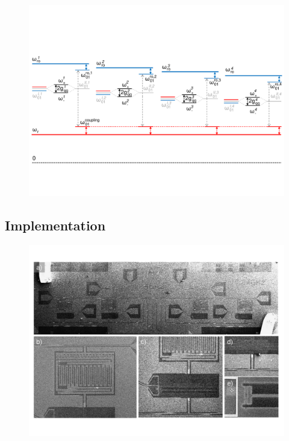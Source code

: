 \begin{figure}[ht!]
	\centering
	\includegraphics[width=\textwidth]{./material/figures/scalable-architecture/qubit_architecture_energy_levels}
	\caption[]{}
	\label{fig:scalable_architecture_energy_levels}
\end{figure}

\subsection{Implementation}

\begin{figure}[ht!]
	\centering
	\includegraphics[width=\textwidth]{./material/figures/scalable-architecture/scalable_architecture_photos}
	\caption[]{}
	\label{fig:scalable_architecture_photos}
\end{figure}

